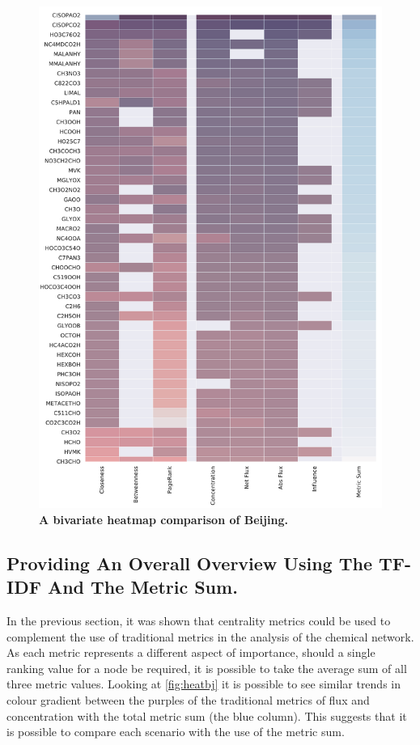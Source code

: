 \begin{figure}[H]
     \centering
         \includegraphics[width=.95\textwidth]{figures_c3/mlpregressor/aphh_Beijing.pdf}
        \caption{ \textbf{A bivariate heatmap comparison of Beijing.} }
        \label{fig:heatbj}
\end{figure}



%
%

\subsection{Providing An Overall Overview Using The TF-IDF And The Metric Sum.}
In the previous section, it was shown that centrality metrics could be used to complement the use of traditional metrics in the analysis of the chemical network. As each metric represents a different aspect of importance, should a single ranking value for a node be required, it is possible to take the average sum of all three metric values. Looking at \autoref{fig:heatbj} it is possible to see similar trends in colour gradient between the purples of the traditional metrics of flux and concentration with the total metric sum (the blue column). This suggests that it is possible to compare each scenario with the use of the metric sum.


